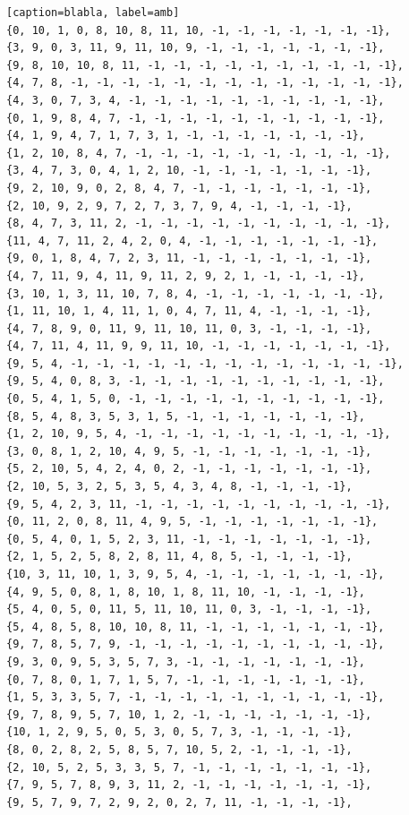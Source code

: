 \documentclass[12pt]{article}
\begin{document}
\begin{lstlisting}[frame=single][caption=blabla, label=amb]
{0, 10, 1, 0, 8, 10, 8, 11, 10, -1, -1, -1, -1, -1, -1, -1},
{3, 9, 0, 3, 11, 9, 11, 10, 9, -1, -1, -1, -1, -1, -1, -1},
{9, 8, 10, 10, 8, 11, -1, -1, -1, -1, -1, -1, -1, -1, -1, -1},
{4, 7, 8, -1, -1, -1, -1, -1, -1, -1, -1, -1, -1, -1, -1, -1},
{4, 3, 0, 7, 3, 4, -1, -1, -1, -1, -1, -1, -1, -1, -1, -1},
{0, 1, 9, 8, 4, 7, -1, -1, -1, -1, -1, -1, -1, -1, -1, -1},
{4, 1, 9, 4, 7, 1, 7, 3, 1, -1, -1, -1, -1, -1, -1, -1},
{1, 2, 10, 8, 4, 7, -1, -1, -1, -1, -1, -1, -1, -1, -1, -1},
{3, 4, 7, 3, 0, 4, 1, 2, 10, -1, -1, -1, -1, -1, -1, -1},
{9, 2, 10, 9, 0, 2, 8, 4, 7, -1, -1, -1, -1, -1, -1, -1},
{2, 10, 9, 2, 9, 7, 2, 7, 3, 7, 9, 4, -1, -1, -1, -1},
{8, 4, 7, 3, 11, 2, -1, -1, -1, -1, -1, -1, -1, -1, -1, -1},
{11, 4, 7, 11, 2, 4, 2, 0, 4, -1, -1, -1, -1, -1, -1, -1},
{9, 0, 1, 8, 4, 7, 2, 3, 11, -1, -1, -1, -1, -1, -1, -1},
{4, 7, 11, 9, 4, 11, 9, 11, 2, 9, 2, 1, -1, -1, -1, -1},
{3, 10, 1, 3, 11, 10, 7, 8, 4, -1, -1, -1, -1, -1, -1, -1},
{1, 11, 10, 1, 4, 11, 1, 0, 4, 7, 11, 4, -1, -1, -1, -1},
{4, 7, 8, 9, 0, 11, 9, 11, 10, 11, 0, 3, -1, -1, -1, -1},
{4, 7, 11, 4, 11, 9, 9, 11, 10, -1, -1, -1, -1, -1, -1, -1},
{9, 5, 4, -1, -1, -1, -1, -1, -1, -1, -1, -1, -1, -1, -1, -1},
{9, 5, 4, 0, 8, 3, -1, -1, -1, -1, -1, -1, -1, -1, -1, -1},
{0, 5, 4, 1, 5, 0, -1, -1, -1, -1, -1, -1, -1, -1, -1, -1},
{8, 5, 4, 8, 3, 5, 3, 1, 5, -1, -1, -1, -1, -1, -1, -1},
{1, 2, 10, 9, 5, 4, -1, -1, -1, -1, -1, -1, -1, -1, -1, -1},
{3, 0, 8, 1, 2, 10, 4, 9, 5, -1, -1, -1, -1, -1, -1, -1},
{5, 2, 10, 5, 4, 2, 4, 0, 2, -1, -1, -1, -1, -1, -1, -1},
{2, 10, 5, 3, 2, 5, 3, 5, 4, 3, 4, 8, -1, -1, -1, -1},
{9, 5, 4, 2, 3, 11, -1, -1, -1, -1, -1, -1, -1, -1, -1, -1},
{0, 11, 2, 0, 8, 11, 4, 9, 5, -1, -1, -1, -1, -1, -1, -1},
{0, 5, 4, 0, 1, 5, 2, 3, 11, -1, -1, -1, -1, -1, -1, -1},
{2, 1, 5, 2, 5, 8, 2, 8, 11, 4, 8, 5, -1, -1, -1, -1},
{10, 3, 11, 10, 1, 3, 9, 5, 4, -1, -1, -1, -1, -1, -1, -1},
{4, 9, 5, 0, 8, 1, 8, 10, 1, 8, 11, 10, -1, -1, -1, -1},
{5, 4, 0, 5, 0, 11, 5, 11, 10, 11, 0, 3, -1, -1, -1, -1},
{5, 4, 8, 5, 8, 10, 10, 8, 11, -1, -1, -1, -1, -1, -1, -1},
{9, 7, 8, 5, 7, 9, -1, -1, -1, -1, -1, -1, -1, -1, -1, -1},
{9, 3, 0, 9, 5, 3, 5, 7, 3, -1, -1, -1, -1, -1, -1, -1},
{0, 7, 8, 0, 1, 7, 1, 5, 7, -1, -1, -1, -1, -1, -1, -1},
{1, 5, 3, 3, 5, 7, -1, -1, -1, -1, -1, -1, -1, -1, -1, -1},
{9, 7, 8, 9, 5, 7, 10, 1, 2, -1, -1, -1, -1, -1, -1, -1},
{10, 1, 2, 9, 5, 0, 5, 3, 0, 5, 7, 3, -1, -1, -1, -1},
{8, 0, 2, 8, 2, 5, 8, 5, 7, 10, 5, 2, -1, -1, -1, -1},
{2, 10, 5, 2, 5, 3, 3, 5, 7, -1, -1, -1, -1, -1, -1, -1},
{7, 9, 5, 7, 8, 9, 3, 11, 2, -1, -1, -1, -1, -1, -1, -1},
{9, 5, 7, 9, 7, 2, 9, 2, 0, 2, 7, 11, -1, -1, -1, -1},

\end{lstlisting}
\end{document}

